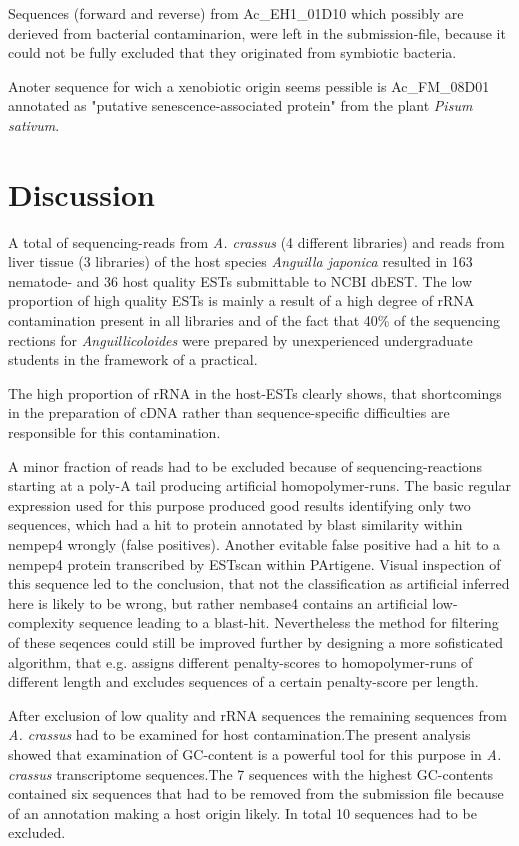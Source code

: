 \documentclass[12pt,a4paper]{article}
\begin{document}
Sequences (forward and reverse) from Ac\_EH1\_01D10 which possibly are
derieved from bacterial contaminarion, were left in the
submission-file, because it could not be fully excluded that they
originated from symbiotic bacteria.

Anoter sequence for wich a xenobiotic origin seems pessible is
Ac\_FM\_08D01 annotated as "putative senescence-associated protein"
from the plant \textit{Pisum sativum}.

\section*{Discussion}

A total of  sequencing-reads from
\textit{A. crassus} (4 different libraries) and
 reads from liver tissue (3 libraries)
of the host species \textit{Anguilla japonica} resulted in
163 nematode- and
36 host quality ESTs submittable to NCBI
dbEST. The low proportion of high quality ESTs is mainly a result of a
high degree of rRNA contamination present in all libraries and of the
fact that 40\% of the sequencing rections for
\textit{Anguillicoloides} were prepared by unexperienced undergraduate
students in the framework of a practical.

The high proportion of rRNA in the host-ESTs clearly shows, that
shortcomings in the preparation of cDNA rather than sequence-specific
difficulties are responsible for this contamination.

A minor fraction of reads had to be excluded because of
sequencing-reactions starting at a poly-A tail producing artificial
homopolymer-runs. The basic regular expression used for this purpose
produced good results identifying only two sequences, which had a hit
to protein annotated by blast similarity within nempep4 wrongly (false
positives). Another evitable false positive had a hit to a nempep4
protein transcribed by ESTscan\cite{estscan} within PArtigene. Visual
inspection of this sequence led to the conclusion, that not the
classification as artificial inferred here is likely to be wrong, but
rather nembase4 contains an artificial low-complexity sequence leading
to a blast-hit. Nevertheless the method for filtering of these
seqences could still be improved further by designing a more
sofisticated algorithm, that e.g. assigns different penalty-scores to
homopolymer-runs of different length and excludes sequences of a
certain penalty-score per length.

After exclusion of low quality and rRNA sequences the remaining
sequences from \textit{A. crassus} had to be examined for host
contamination.The present analysis showed that examination of
GC-content is a powerful tool for this purpose in \textit{A. crassus}
transcriptome sequences.The 7 sequences with the highest GC-contents
contained six sequences that had to be removed from the submission
file because of an annotation making a host origin likely. In total 10
sequences had to be excluded.
\end{document}
